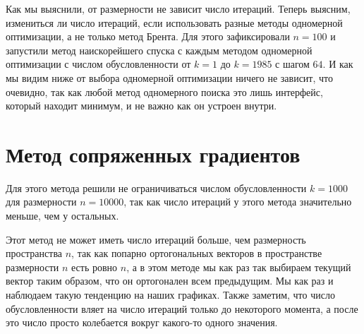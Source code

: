 Как мы выяснили, от размерности не зависит число итераций. Теперь выясним, измениться ли число итераций, если 
использовать разные методы одномерной оптимизации, а не только метод Брента. Для этого зафиксировали 
$n = 100$ и запустили метод наискорейшего спуска с каждым методом одномерной оптимизации
с числом обусловленности от $k = 1$ до $k = 1985$ с шагом $64$. И как мы видим ниже от выбора 
одномерной оптимизации ничего не зависит, что очевидно, так как любой метод одномерного поиска это лишь
интерфейс, который находит минимум, и не важно как он устроен внутри.

\begin{flushleft}
\end{flushleft}

\newpage
\section{Метод сопряженных градиентов}

Для этого метода решили не ограничиваться числом обусловленности \newline $k = 1000$ для размерности $n = 10000$,
так как число итераций у этого метода значительно меньше, чем у остальных.

Этот метод не может иметь число итераций больше, чем размерность пространства $n$, так как попарно ортогональных
векторов в пространстве размерности $n$ есть ровно $n$, а в этом методе мы как раз так выбираем текущий вектор таким
образом, что он ортогонален всем предыдущим. Мы как раз и наблюдаем такую тенденцию на наших графиках.
Также заметим, что число обусловленности вляет на число итераций только до некоторого момента, а после это 
число просто колебается вокруг какого-то одного значения.

